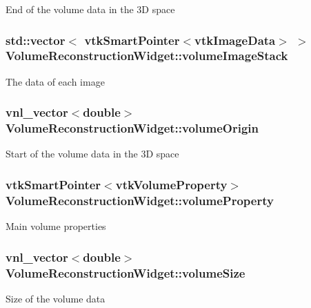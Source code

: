 End of the volume data in the 3\-D space \hypertarget{class_volume_reconstruction_widget_a521dcefa95fe4f079622c83e162349b5}{
\subsubsection[{volume\-Image\-Stack}]{\setlength{\rightskip}{0pt plus 5cm}std\-::vector$<$ vtk\-Smart\-Pointer$<$vtk\-Image\-Data$>$ $>$ {\bf Volume\-Reconstruction\-Widget\-::volume\-Image\-Stack}}}\label{d5/d55/class_volume_reconstruction_widget_a521dcefa95fe4f079622c83e162349b5}
The data of each image \hypertarget{class_volume_reconstruction_widget_a8a96c61c0e699daeaa349bc94610863b}{
\subsubsection[{volume\-Origin}]{\setlength{\rightskip}{0pt plus 5cm}vnl\-\_\-vector$<$double$>$ {\bf Volume\-Reconstruction\-Widget\-::volume\-Origin}}}\label{d5/d55/class_volume_reconstruction_widget_a8a96c61c0e699daeaa349bc94610863b}
Start of the volume data in the 3\-D space \hypertarget{class_volume_reconstruction_widget_aa019933b9a5cdfee94739d13b383b7b8}{
\subsubsection[{volume\-Property}]{\setlength{\rightskip}{0pt plus 5cm}vtk\-Smart\-Pointer$<$vtk\-Volume\-Property$>$ {\bf Volume\-Reconstruction\-Widget\-::volume\-Property}}}\label{d5/d55/class_volume_reconstruction_widget_aa019933b9a5cdfee94739d13b383b7b8}
Main volume properties \hypertarget{class_volume_reconstruction_widget_ac6e459db730b1349685d3d01e95692bd}{
\subsubsection[{volume\-Size}]{\setlength{\rightskip}{0pt plus 5cm}vnl\-\_\-vector$<$double$>$ {\bf Volume\-Reconstruction\-Widget\-::volume\-Size}}}\label{d5/d55/class_volume_reconstruction_widget_ac6e459db730b1349685d3d01e95692bd}
Size of the volume data 

